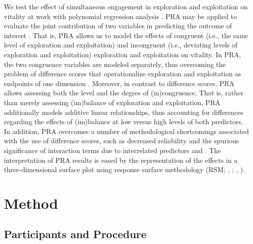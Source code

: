 \documentclass[man, 12pt, a4paper, noextraspace]{apa6}
\begin{document}
We test the effect of simultaneous engagement in exploration and exploitation on vitality at work with polynomial regression analysis \parencite[PRA;][]{Edwards.1993a, Schonbrodt2018, Humberg2019}. 
PRA may be applied to evaluate the joint contribution of two variables in predicting the outcome of interest \parencite{Edwards.1993a}. 
That is, PRA allows us to model the effects of congruent (i.e., the same level of exploration and exploitation) and incongruent (i.e., deviating levels of exploration and exploitation) exploration and exploitation on vitality. 
In PRA, the two congruence variables are modeled separately, thus overcoming the problem of difference scores that operationalize exploration and exploitation as endpoints of one dimension \parencite{Edwards.1993a}.
Moreover, in contrast to difference scores, PRA allows assessing both the level and the degree of (in)congruence. 
That is, rather than merely assessing (im)balance of exploration and exploitation, PRA additionally models additive linear relationships, thus accounting for differences regarding the effects of (im)balance at low versus high levels of both predictors. 
In addition, PRA overcomes a number of methodological shortcomings associated with the use of difference scores, such as decreased reliability and the spurious significance of interaction terms due to interrelated predictors and  \parencite{Cortina1993}. 
The interpretation of PRA results is eased by the representation of the effects in a three-dimensional surface plot \parencite{Edwards.1993a} using response surface methodology (RSM; \citeauthor{Humberg2019}, \citeyear{Humberg2019}; \citeauthor{Shanock.2010b}, \citeyear{Shanock.2010b}). 

\section{Method}

\subsection{Participants and Procedure} 
\end{document}
